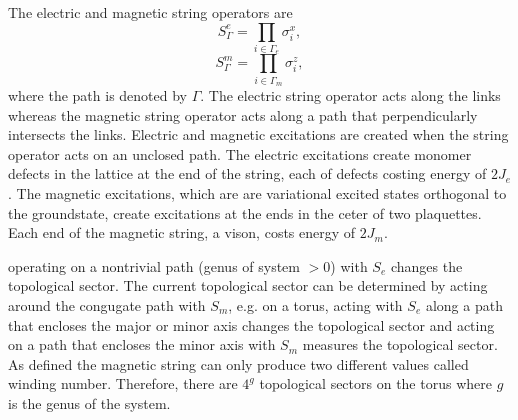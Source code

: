 \documentclass[twocolumn,prb,aps,floatfix,superscriptaddress]{revtex4-1}
\begin{document}
    The electric and magnetic string operators are
    \begin{equation}
        S^e_{\Gamma} = \prod_{i\in\Gamma_e} \sigma^x_i
        ,
    \end{equation}
    \begin{equation}
        S^m_{\Gamma} = \prod_{i\in\Gamma_m} \sigma^z_i
        ,
    \end{equation}
    where the path is denoted by $\Gamma$. The electric string operator acts along the
    links whereas the magnetic string operator acts along a path that perpendicularly
    intersects the links. 
    Electric and magnetic excitations are created when the string operator acts on an unclosed path. 
    The electric excitations create monomer defects in the lattice at the end of the string, 
    each of defects costing energy of $2J_e$. 
    The magnetic excitations, which are 
    are variational excited states  orthogonal
    to the groundstate, create excitations at the ends in the ceter of two plaquettes.
    Each end of the magnetic
    string, a vison, costs energy of $2J_m$. 

    operating on a nontrivial path (genus of system $>0$) with $S_e$ changes the topological sector.
    The current topological sector can be determined
    by acting around the congugate path with $S_m$, e.g. on a torus, acting with $S_e$ along a
    path that encloses the major or minor axis changes the topological sector and acting on a path
    that encloses the minor axis with $S_m$ measures the topological sector.
    As defined the magnetic string can only produce two different values called winding number.
    Therefore, there are $4^g$ topological sectors on the torus where $g$ is the
    genus of the system. 
\end{document}
